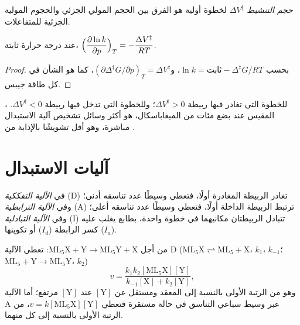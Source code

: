 \begin{definition}\label{def:b3:complex-mechanisms:activation-volume}
\emph{حجم التنشيط} $\Delta V^{\ddagger}$ لخطوة أولية
هو الفرق بين الحجم المولي الجزئي  والحجوم المولية الجزئية للمتفاعلات.
\end{definition}

\begin{proposition}\label{prop:b3:complex-mechanisms:pressure}
عند درجة حرارة ثابتة، $\displaystyle\Bigl(\frac{\partial\ln k}{\partial p}\Bigr)_T = -\frac{\Delta V^{\ddagger}}{RT}$.
\end{proposition}

\begin{proof}
بحسب  $\ln k = \text{ثابت} - \Delta^{\ddagger}G/RT$، و$(\partial\Delta^{\ddagger}G/\partial p)_T = \Delta V^{\ddagger}$، كما هو الشأن في
كل طاقة جيبس.
\end{proof}

للخطوة التي تغادر فيها ربيطة $\Delta V^{\ddagger} > 0$؛ وللخطوة التي تدخل فيها ربيطة $\Delta V^{\ddagger}
< 0$. ، المقيس عند بضع مئات من الميغاباسكال، هو أكثر
وسائل تشخيص آلية الاستبدال مباشرة، وهو أقل تشويشًا بالإذابة من
.

\section{آليات الاستبدال}

\begin{definition}\label{def:b3:complex-mechanisms:mechanisms}
في \emph{الآلية التفككية} (D) تغادر الربيطة
المغادرة أولًا، فتعطي وسيطًا عدد تناسقه أدنى؛ وفي
\emph{الآلية الترابطية} (A) ترتبط الربيطة الداخلة
أولًا، فتعطي وسيطًا عدد تناسقه أعلى؛ وفي
\emph{الآلية التبادلية} (I) تتبادل الربيطتان
مكانيهما في خطوة واحدة، بطابع يغلب عليه كسر الرابطة ($I_d$) أو تكوينها ($I_a$).
\end{definition}

\begin{proposition}\label{prop:b3:complex-mechanisms:d-a-laws}
من أجل $\mathrm{ML_5X + Y \to ML_5Y + X}$: تعطي الآلية D ($\mathrm{ML_5X} \rightleftharpoons \mathrm{ML_5} + \mathrm X$، $k_1$، $k_{-1}$؛ $\mathrm{ML_5} + \mathrm Y
\to \mathrm{ML_5Y}$، $k_2$)
\[
  v = \frac{k_1k_2[\mathrm{ML_5X}][\mathrm Y]}{k_{-1}[\mathrm X] + k_2[\mathrm Y]},
\]
وهو من الرتبة الأولى بالنسبة إلى المعقد ومستقل عن $[\mathrm Y]$ عند $[\mathrm Y]$ مرتفع؛ أما الآلية A
عبر وسيط سباعي التناسق في حالة مستقرة فتعطي $v =
k[\mathrm{ML_5X}][\mathrm Y]$، من الرتبة الأولى بالنسبة إلى كل منهما.
\end{proposition}


